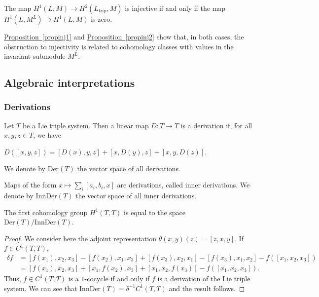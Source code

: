 \documentclass[11pt, twoside]{article}
\begin{document}
\begin{prop}\label{propinj2}
    The map $H^1(L,M)\to H^2(L_\mathrm{trip},M)$ is injective if and only if the map $H^1(L,M^L)\to H^1(L,M) $ is zero.
\end{prop}

\hyperref[propinj1]{Proposition~\ref*{propinj1}} and \hyperref[propinj2]{Proposition~\ref*{propinj2}} show that, in both cases, the obstruction to injectivity is related to cohomology classes with values in the invariant submodule $M^L$.

\subsection{Algebraic interpretations}

\subsubsection{Derivations}

\begin{defi}
    Let $T$ be a Lie triple system. Then a linear map $D:T\to T$ is a derivation if, for all $x,y,z \in T$, we have \begin{center}
        $D([x,y,z])= [D(x),y,z]+ [x,D(y),z]+ [x,y,D(z)] $.
    \end{center}  We denote by $\mathrm{Der}(T)$ the vector space of all  derivations.
\end{defi}

\begin{ex}
    Maps of the form $x\mapsto\sum\limits_i[a_i,b_i,x]  $ are derivations, called inner derivations. We denote by $\mathrm{InnDer}(T)$ the vector space of all inner derivations.
\end{ex}

\begin{prop}
   The first cohomology group $H^1(T,T) $ is equal to the space $\mathrm{Der}(T)/\mathrm{InnDer}(T) $.
\end{prop}

\begin{proof}
    We consider here the adjoint representation $\theta(x,y)(z)=[z,x,y] $. If $f\in C^1(T,T) $, \begin{align*}
    \delta f &= [f(x_1),x_2,x_3]- [f(x_2),x_1,x_3]+ [f(x_3),x_2,x_1]- [f(x_3),x_1,x_2]- f([x_1,x_2,x_3]) \\ &= [f(x_1),x_2,x_3]+ [x_1,f(x_2),x_3]+ [x_1,x_2,f(x_3)]- f([x_1,x_2,x_3]).
\end{align*} Thus, $f\in C^1(T,T)$ is a $1$-cocycle if and only if $f $ is a derivation of the Lie triple system. We can see that $\mathrm{InnDer}(T)=\delta^{-1}C^1(T,T) $ and the result follows.
\end{proof}
\end{document}
